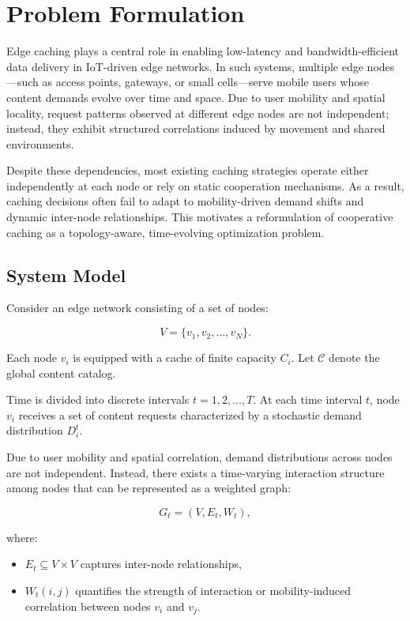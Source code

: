 \section{Problem Formulation}

Edge caching plays a central role in enabling low-latency and bandwidth-efficient data delivery in IoT-driven edge networks. In such systems, multiple edge nodes—such as access points, gateways, or small cells—serve mobile users whose content demands evolve over time and space. Due to user mobility and spatial locality, request patterns observed at different edge nodes are not independent; instead, they exhibit structured correlations induced by movement and shared environments.

Despite these dependencies, most existing caching strategies operate either independently at each node or rely on static cooperation mechanisms. As a result, caching decisions often fail to adapt to mobility-driven demand shifts and dynamic inter-node relationships. This motivates a reformulation of cooperative caching as a topology-aware, time-evolving optimization problem.

\subsection{System Model}

Consider an edge network consisting of a set of nodes:

\begin{equation}
V = \{v_1, v_2, ..., v_N\}.
\end{equation}

Each node $v_i$ is equipped with a cache of finite capacity $C_i$. Let $\mathcal{C}$ denote the global content catalog.

Time is divided into discrete intervals $t = 1, 2, ..., T$. At each time interval $t$, node $v_i$ receives a set of content requests characterized by a stochastic demand distribution $D_i^t$.

Due to user mobility and spatial correlation, demand distributions across nodes are not independent. Instead, there exists a time-varying interaction structure among nodes that can be represented as a weighted graph:

\begin{equation}
G_t = (V, E_t, W_t),
\end{equation}

where:

\begin{itemize}
    \item $E_t \subseteq V \times V$ captures inter-node relationships,
    \item $W_t(i,j)$ quantifies the strength of interaction or mobility-induced correlation between nodes $v_i$ and $v_j$.
\end{itemize}

